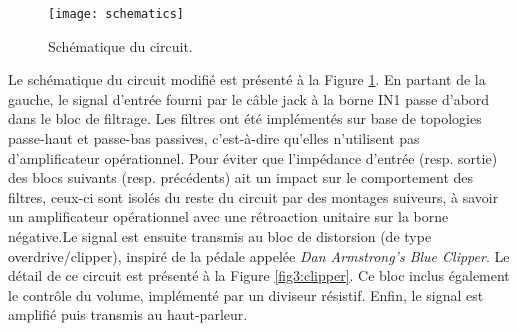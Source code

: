 \begin{figure}[ht!]
	\centering
	\texttt{[image: schematics]}
	\caption{Schématique du circuit.}
	\label{fig2:schematics}
\end{figure}

Le schématique du circuit modifié est présenté à la Figure \ref{fig2:schematics}. En partant de la gauche, le signal d'entrée fourni par le câble jack à la borne IN1 passe d'abord dans le bloc de filtrage. Les filtres ont été implémentés sur base de topologies passe-haut et passe-bas passives, c'est-à-dire qu'elles n'utilisent pas d'amplificateur opérationnel. Pour éviter que l'impédance d'entrée (resp. sortie) des blocs suivants (resp. précédents) ait un impact sur le comportement des filtres, ceux-ci sont isolés du reste du circuit par des montages suiveurs, à savoir un amplificateur opérationnel avec une rétroaction unitaire sur la borne négative.Le signal est ensuite transmis au bloc de distorsion (de type overdrive/clipper), inspiré de la pédale appelée \textit{Dan Armstrong's Blue Clipper}. Le détail de ce circuit est présenté à la Figure \ref{fig3:clipper}. Ce bloc inclus également le contrôle du volume, implémenté par un diviseur résistif. Enfin, le signal est amplifié puis transmis au haut-parleur.